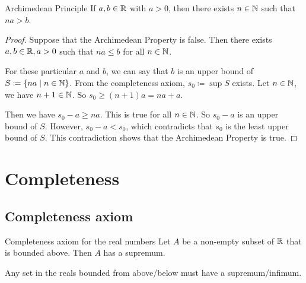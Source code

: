 \begin{thrm}{Archimedean Principle}{}
If $a,b \in \mathbb R$ with $a>0$, then there exists $n \in \mathbb N$ such that $na>b$.
\end{thrm}
\begin{proof}
Suppose that the Archimedean Property is false. Then there exists $a, b \in \mathbb R, a > 0$ such that $na \le b$ for all $n \in \mathbb N$.

For these particular $a$ and $b$, we can say that $b$ is an upper bound of $S \coloneqq \{na \mid n \in \mathbb N\}$. From the completeness axiom, $s_0 \coloneqq \sup S$ exists. Let $n \in \mathbb N$, we have $n+1 \in \mathbb N$. So $s_0 \ge (n+1)a = na+a$.

Then we have $s_0-a \ge na$. This is true for all $n \in \mathbb N$. So $s_0-a$ is an upper bound of $S$. However, $s_0-a<s_0$, which contradicts that $s_0$ is the least upper bound of $S$. This contradiction shows that the Archimedean Property is true.
\end{proof}
\pagebreak

\section{Completeness}
\subsection{Completeness axiom}
\begin{thrm}{Completeness axiom for the real numbers}{}
Let $A$ be a non-empty subset of $\mathbb R$ that is bounded above. Then $A$ has a supremum.
\end{thrm}

Any set in the reals bounded from above/below must have a supremum/infimum.

